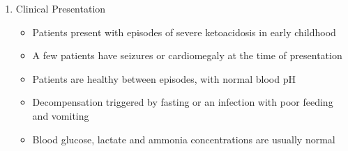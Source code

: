 \documentclass{scrartcl}
\begin{document}
\begin{enumerate}
\item Clinical Presentation
\label{sec:orgcdb6c03}
\begin{itemize}
\item Patients present with episodes of severe ketoacidosis in early childhood
\item A few patients have seizures or cardiomegaly at the time of presentation
\item Patients are healthy between episodes, with normal blood pH
\item Decompensation triggered by fasting or an infection with poor
feeding and vomiting
\item Blood glucose, lactate and ammonia concentrations are usually normal
\end{itemize}


\end{enumerate}
\end{document}
